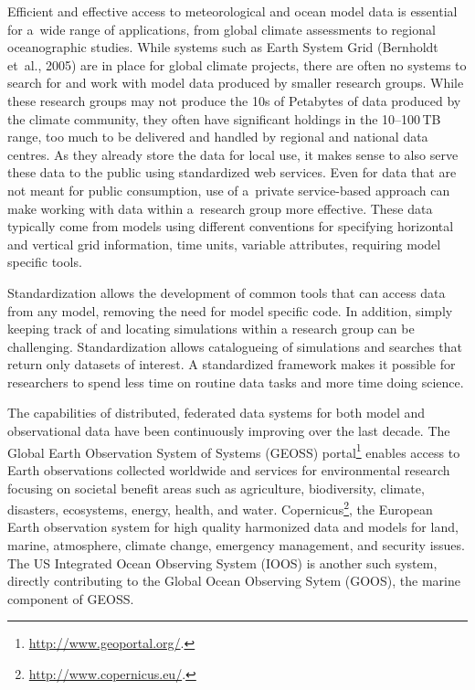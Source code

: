 \documentclass[osd, online, hvmath]{copernicus}
\begin{document}
\introduction

Efficient and effective access to meteorological and ocean model data
is essential for a~wide range of applications, from global climate
assessments   to regional oceanographic studies. 
 While systems such as Earth System Grid (Bernholdt et~al., 2005)
are in place for global climate projects, there are often no 
systems to search for and work with model data produced by
smaller research groups. While these research groups may not produce
the 10s of Petabytes of data produced by the climate community, they 
often have significant holdings in the 10--100\,TB range, too much to
be delivered and handled by regional and national data centres.  As
they already store the data for local use, it makes sense to also
serve these data to the public using standardized web services. Even
for data that are not meant for public consumption, use of a~private
service-based approach can make working with data within a~research
group more effective. These data typically come from models using
different conventions for specifying horizontal and vertical grid information, time units, variable attributes, requiring model specific tools. 

Standardization allows
the development of common tools that can access data from any model,
removing the need for model specific code.  
 In addition, simply keeping track of and locating simulations within a research group can be challenging.  
 Standardization allows catalogueing of simulations and searches that return only datasets of interest.  
A standardized framework makes it possible for
researchers to spend less time on routine data tasks and more time
doing science.

The capabilities of distributed, federated data systems for both model
and observational data have been continuously improving over the last
decade.  The Global Earth Observation System of Systems (GEOSS)
portal\footnote{\url{http://www.geoportal.org/}.} enables access to
Earth observations collected worldwide and services for environmental
research focusing on societal benefit areas such as agriculture,
biodiversity, climate, disasters, ecosystems, energy, health, and
water. Copernicus\footnote{\url{http://www.copernicus.eu/}.}, the
European %
Earth observation system for
high quality harmonized data and models for land, marine, atmosphere,
climate change, emergency management, and security issues. The US
Integrated Ocean Observing System (IOOS) is another such system,
directly contributing to the Global Ocean Observing Sytem (GOOS), the
marine component of GEOSS.
\end{document}
